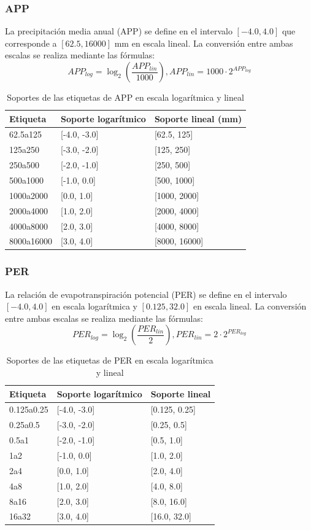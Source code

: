 \documentclass[11pt,a4paper]{article}
\begin{document}
\subsubsection{APP}

La precipitación media anual (APP) se define en el intervalo \([-4.0, 4.0]\) que corresponde a \([62.5, 16000]\) mm en escala lineal.
La conversión entre ambas escalas se realiza mediante las fórmulas:
$$
    APP_{log} = \log_{2}\left(\frac{APP_{lin}}{1000}\right), APP_{lin} = 1000 \cdot 2^{APP_{log}}
$$
\begin{table}[H]
\centering
\caption{Soportes de las etiquetas de APP en escala logarítmica y lineal}
\label{tab:app-soportes}
\begin{tabular}{@{}lll@{}}
\toprule
Etiqueta & Soporte logarítmico & Soporte lineal (mm) \\
\midrule
62.5a125 & [-4.0, -3.0] & [62.5, 125] \\
125a250 & [-3.0, -2.0] & [125, 250] \\
250a500 & [-2.0, -1.0] & [250, 500] \\
500a1000 & [-1.0, 0.0] & [500, 1000] \\
1000a2000 & [0.0, 1.0] & [1000, 2000] \\
2000a4000 & [1.0, 2.0] & [2000, 4000] \\
4000a8000 & [2.0, 3.0] & [4000, 8000] \\
8000a16000 & [3.0, 4.0] & [8000, 16000] \\
\bottomrule
\end{tabular}
\end{table}

\subsubsection{PER}
La relación de evapotranspiración potencial (PER) se define en el intervalo \([-4.0, 4.0]\) en escala logarítmica y \([0.125, 32.0]\) en escala lineal.
La conversión entre ambas escalas se realiza mediante las fórmulas:
$$
    PER_{log} = \log_{2}\left(\frac{PER_{lin}}{2}\right), PER_{lin} = 2 \cdot 2^{PER_{log}}
$$
\begin{table}[H]
\centering
\caption{Soportes de las etiquetas de PER en escala logarítmica y lineal}
\label{tab:per-soportes}
\begin{tabular}{@{}lll@{}}
\toprule
Etiqueta & Soporte logarítmico & Soporte lineal \\
\midrule
0.125a0.25 & [-4.0, -3.0] & [0.125, 0.25] \\
0.25a0.5 & [-3.0, -2.0] & [0.25, 0.5] \\
0.5a1 & [-2.0, -1.0] & [0.5, 1.0] \\
1a2 & [-1.0, 0.0] & [1.0, 2.0] \\
2a4 & [0.0, 1.0] & [2.0, 4.0] \\
4a8 & [1.0, 2.0] & [4.0, 8.0] \\
8a16 & [2.0, 3.0] & [8.0, 16.0] \\
16a32 & [3.0, 4.0] & [16.0, 32.0] \\
\bottomrule
\end{tabular}
\end{table}
\end{document}
